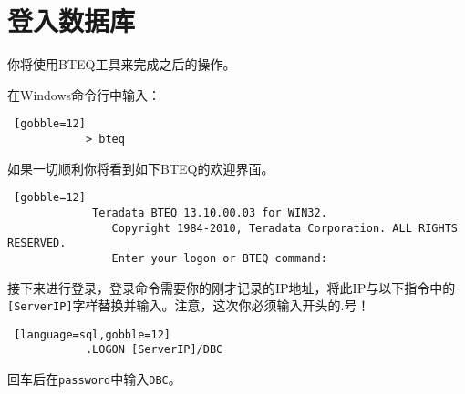 \documentclass{article}
\begin{document}




	\section{登入数据库} %
		你将使用BTEQ工具来完成之后的操作。

		在Windows命令行中输入：

		\begin{lstlisting} [gobble=12]
			> bteq
		\end{lstlisting}

		如果一切顺利你将看到如下BTEQ的欢迎界面。
		\begin{lstlisting} [gobble=12]
			 Teradata BTEQ 13.10.00.03 for WIN32.
				Copyright 1984-2010, Teradata Corporation. ALL RIGHTS RESERVED.
				Enter your logon or BTEQ command:

		\end{lstlisting}

		接下来进行登录，登录命令需要你的刚才记录的IP地址，将此IP与以下指令中的\lstinline|[ServerIP]|字样替换并输入。注意，这次你必须输入开头的.号！

		\begin{lstlisting} [language=sql,gobble=12]
			.LOGON [ServerIP]/DBC
		\end{lstlisting}

		回车后在\lstinline|password|中输入\lstinline|DBC|。
\end{document}
